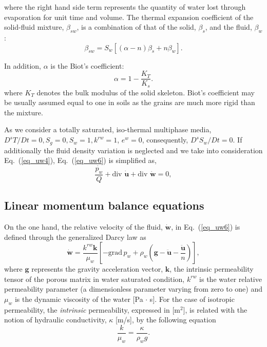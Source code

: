 \documentclass[twocolumn]{svjour3}          %
\begin{document}
where the right hand side term represents the quantity of water lost through evaporation for unit time and volume. The  thermal expansion coefficient of the solid-fluid mixture, $\beta_{sw}$, is a combination of that of the solid, $\beta_s$, and  the fluid, $\beta_w$:
\begin{equation}
\beta_{sw} = S_w [(\alpha-n)\beta_s +n \beta_w].
\end{equation}

In addition, $\alpha$ is the Biot's coefficient:
\begin{equation}\label{eq_uw7}
\alpha=1-\frac{K_T}{K_s}.
\end{equation}
where $K_T$ denotes the %
 bulk modulus of the solid skeleton.  Biot's coefficient may be usually assumed equal to one in soils as the grains are much more rigid than the mixture. 
   
As we consider a totally saturated, iso-thermal multiphase media,  $D^s T/D t =0, S_g=0, S_w=1, k^{rw}=1$, $e^w=0$, consequently, %
$D^s S_w/D t =0$. If  additionally  the fluid density variation is neglected and we take into consideration Eq.~(\ref{eq_uw4}),  Eq.~(\ref{eq_uw6}) is simplified as,
\begin{equation}
\frac{\dot{p_w}}{Q} +  \mbox{div }  \boldsymbol{\dot{u}} + \mbox{div } \boldsymbol{\dot{w}} = 0 \label{eq_uw10},
\end{equation}


\subsection{Linear momentum balance equations}
\label{subsec:22}
On the one hand, the relative velocity of the fluid, %
   $\dot{\boldsymbol{w}}$, in Eq.~(\ref{eq_uw6})  is defined through the generalized Darcy law as~\cite{LewisSchrefler98}
\begin{equation}\label{eq_uw8}
\dot{\boldsymbol{w}}=\frac{k^{rw}\boldsymbol{k}}{\mu_w}\left[ -\mbox{grad} \,p_w + \rho_w(\boldsymbol{g}-\ddot{\boldsymbol{u}}-\frac{\ddot{\boldsymbol{u}}}{n})\right] ,
\end{equation}
where $\boldsymbol{g}$ represents the gravity acceleration vector,  $\boldsymbol{k}$, the intrinsic permeability tensor of the porous matrix in water saturated condition, $k^{rw}$ is the water relative permeability parameter (a dimensionless parameter varying from zero to one) and $\mu_w$ is the dynamic viscosity of the water [Pa $\cdot$ s].  For the case of isotropic permeability,   the {\it intrinsic}  permeability, expressed in  [m$^{2}$], is related with the  notion of  hydraulic conductivity,  $\kappa$ [m/s],  by the following equation
\begin{equation}\label{eq_uw9}
\frac{k}{\mu_w}=\frac{\kappa}{\rho_w g}.
\end{equation}
\end{document}
